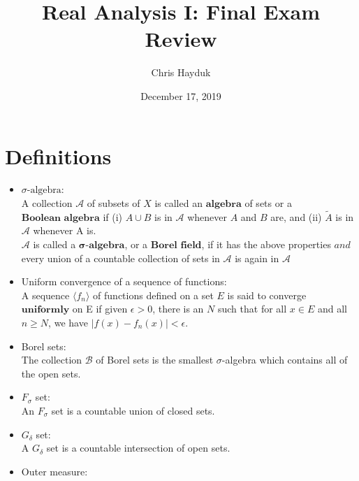 \documentclass[12pt]{article}
\begin{document}
\title{Real Analysis I: Final Exam Review}

\author{Chris Hayduk}
\date{December 17, 2019}

\maketitle

\section{Definitions}

\begin{itemize}

\item $\sigma\text{-algebra}$:\\

A collection $\mathscr{A}$ of subsets of $X$ is called an $\textbf{algebra}$ of sets or a $\textbf{Boolean algebra}$ if (i) $A \cup B$ is in $\mathscr{A}$ whenever $A$ and $B$ are, and (ii) $\tilde{A}$ is in $\mathscr{A}$ whenever A is.\\

$\mathscr{A}$ is called a $\mathbf{\sigma}\textbf{-algebra}$, or a $\textbf{Borel field}$, if it has the above properties $\textit{and}$ every union of a countable collection of sets in $\mathscr{A}$ is again in $\mathscr{A}$
\\
\item Uniform convergence of a sequence of functions:\\

A sequence $\langle f_n \rangle$ of functions defined on a set $E$ is said to converge $\textbf{uniformly}$ on E if given $\epsilon > 0$, there is an $N$ such that for all $x \in E$ and all $n \geq N$, we have $|f(x) - f_n(x)| < \epsilon$.
\\
\item Borel sets:\\

The collection $\mathscr{B}$ of Borel sets is the smallest $\sigma$-algebra which contains all of the open sets.
\\
\item $F_{\sigma}$ set:\\

An $F_{\sigma}$ set is a countable union of closed sets.
\\
\item $G_{\delta}$ set:\\

A $G_{\delta}$ set is a countable intersection of open sets.
\\
\item Outer measure:\\


\end{itemize}
\end{document}

